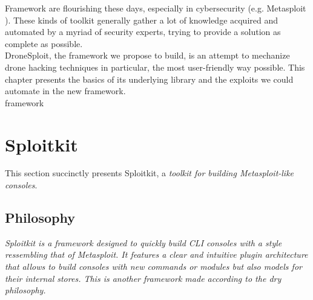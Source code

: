 \begin{chaptercover}{Framework}%
{
{\large \hyphenation{}  are flourishing these days, especially in cybersecurity (e.g. Metasploit \cite{metasploit}). These kinds of toolkit generally gather a lot of knowledge acquired and automated by a myriad of security experts, trying to provide a solution as complete as possible. \newline \\ DroneSploit, the framework we propose to build, is an attempt to mechanize drone hacking techniques in particular, the most user-friendly way possible. This chapter presents the basics of its underlying library and the exploits we could automate in the new framework. \newline\\}}%
{framework}


\section{Sploitkit}

This section succinctly presents Sploitkit, a \textit{toolkit for building Metasploit-like consoles}. \cite{sploitkit}

\subsection{Philosophy}

\textit{Sploitkit is a framework designed to quickly build CLI consoles with a style ressembling that of Metasploit. It features a clear and intuitive plugin architecture that allows to build consoles with new commands or modules but also models for their internal stores. This is another framework made according to the \acrshort{dry} philosophy.} \cite{sploitkit-docs}


\end{chaptercover}
